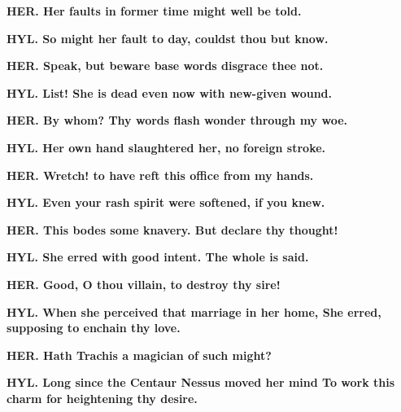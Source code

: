 \documentclass[11pt,letter]{book}
\begin{document}
\par \textbf{HER. Her faults in former time might well be told.}
\par 

\par \textbf{HYL. So might her fault to day, couldst thou but know.}
\par 

\par \textbf{HER. Speak, but beware base words disgrace thee not.}
\par 

\par \textbf{HYL. List! She is dead even now with new-given wound.}
\par 

\par \textbf{HER. By whom? Thy words flash wonder through my woe.}
\par 

\par \textbf{HYL. Her own hand slaughtered her, no foreign stroke.}
\par 

\par \textbf{HER. Wretch! to have reft this office from my hands.}
\par 

\par \textbf{HYL. Even your rash spirit were softened, if you knew.}
\par 

\par \textbf{HER. This bodes some knavery. But declare thy thought!}
\par 

\par \textbf{HYL. She erred with good intent. The whole is said.}
\par 

\par \textbf{HER. Good, O thou villain, to destroy thy sire!}
\par 

\par \textbf{HYL. When she perceived that marriage in her home, She erred, supposing to enchain thy love.}
\par 

\par \textbf{HER. Hath Trachis a magician of such might?}
\par 

\par \textbf{HYL. Long since the Centaur Nessus moved her mind To work this charm for heightening thy desire.}
\par 
\end{document}
